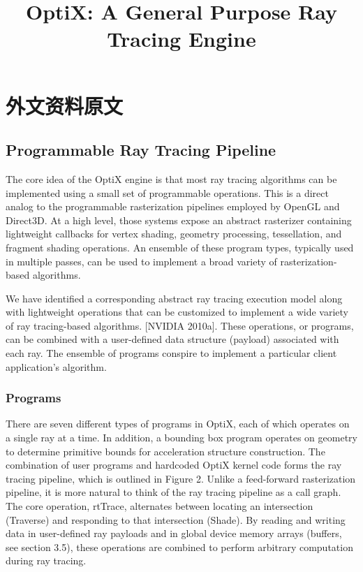 \chapter{外文资料原文}
\label{cha:engorg}

\title{OptiX: A General Purpose Ray Tracing Engine}

\section{Programmable Ray Tracing Pipeline}

The core idea of the OptiX engine is that most ray tracing algorithms can be implemented using a small set of programmable operations. This is a direct analog to the programmable rasterization pipelines employed by OpenGL and Direct3D. At a high level,
those systems expose an abstract rasterizer containing lightweight
callbacks for vertex shading, geometry processing, tessellation, and
fragment shading operations. An ensemble of these program types,
typically used in multiple passes, can be used to implement a broad
variety of rasterization-based algorithms.

We have identified a corresponding abstract ray tracing execution model along with lightweight operations that can be customized to implement a wide variety of ray tracing-based algorithms. [NVIDIA 2010a]. These operations, or programs, can be
combined with a user-defined data structure (payload) associated
with each ray. The ensemble of programs conspire to implement a
particular client application’s algorithm.

\subsection{Programs}

There are seven different types of programs in OptiX, each of which
operates on a single ray at a time. In addition, a bounding box program operates on geometry to determine primitive bounds for acceleration structure construction. The combination of user programs
and hardcoded OptiX kernel code forms the ray tracing pipeline,
which is outlined in Figure 2. Unlike a feed-forward rasterization
pipeline, it is more natural to think of the ray tracing pipeline as a
call graph. The core operation, rtTrace, alternates between locating an intersection (Traverse) and responding to that intersection
(Shade). By reading and writing data in user-defined ray payloads
and in global device memory arrays (buffers, see section 3.5), these
operations are combined to perform arbitrary computation during
ray tracing.

